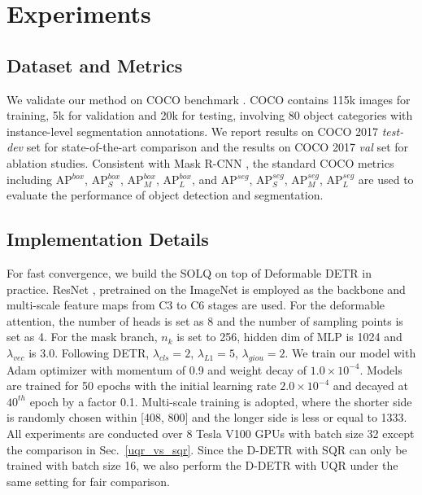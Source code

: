 \documentclass{article}
\begin{document}
\section{Experiments}
\subsection{Dataset and Metrics}
We validate our method on COCO benchmark \cite{lin2014microsoft}. COCO contains 115k images for training, 5k for validation and 20k for testing, involving 80 object categories with instance-level segmentation annotations. We report results on COCO 2017 \textit{test-dev} set for state-of-the-art comparison and the results on COCO 2017 \textit{val} set for ablation studies. Consistent with Mask R-CNN \cite{he2017maskrcnn}, the standard COCO metrics including AP$^{box}$, AP$^{box}_{S}$, AP$^{box}_{M}$, AP$^{box}_{L}$, and AP$^{seg}$, AP$^{seg}_{S}$, AP$^{seg}_{M}$, AP$^{seg}_{L}$ are used to evaluate the performance of object detection and segmentation.

\subsection{Implementation Details}
\label{imple_detail}
For fast convergence, we build the SOLQ on top of Deformable DETR \cite{zhu2020deformabledetr} in practice. ResNet \cite{he2016deep}, pretrained on the ImageNet \cite{Russakovsky2015ImageNet} is employed as the backbone and multi-scale feature maps from C3 to C6 stages are used. For the deformable attention, the number of heads is set as 8 and the number of sampling points is set as 4. For the mask branch, $n_{k}$ is set to 256, hidden dim of MLP is 1024 and $\lambda_{vec}$ is 3.0. Following DETR, $\lambda_{cls}=2$, $\lambda_{L1}=5$, $\lambda_{giou}=2$. We train our model with Adam optimizer with momentum of 0.9 and weight decay of $1.0 \times 10^{-4}$. Models are trained for 50 epochs with the initial learning rate $2.0 \times 10^{-4}$ and decayed at $40^{th}$ epoch by a factor 0.1. Multi-scale training is adopted, where the shorter side is randomly chosen within [408, 800] and the longer side is less or equal to 1333. All experiments are conducted over 8 Tesla V100 GPUs with batch size 32 except the comparison in Sec.~\ref{uqr_vs_sqr}. Since the D-DETR with SQR can only be trained with batch size 16, we also perform the D-DETR with UQR under the same setting for fair comparison. 
\end{document}

